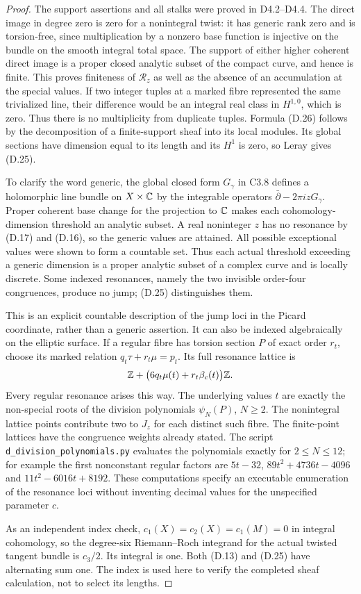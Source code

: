 \begin{proof}
The support assertions and all stalks were proved in D4.2--D4.4.
The direct image in degree zero is zero for a nonintegral twist:
it has generic rank zero and is torsion-free, since multiplication
by a nonzero base function is injective on the bundle on the smooth
integral total space. The support of either higher coherent direct
image is a proper closed analytic subset of the compact curve,
and hence is finite. This proves finiteness of $\mathcal R_z$ as
well as the absence of an accumulation at the special values.
If two integer tuples at a marked fibre represented the same
trivialized line, their difference would be an integral real class
in $H^{1,0}$, which is zero. Thus there is no multiplicity from
duplicate tuples. Formula (D.26) follows by the decomposition of a
finite-support sheaf into its local modules. Its global sections
have dimension equal to its length and its $H^1$ is zero, so Leray
gives (D.25).

To clarify the word generic, the global closed form $G_\gamma$ in
C3.8 defines a holomorphic line bundle on $X\times\mathbb C$ by the
integrable operators $\bar\partial-2\pi i zG_\gamma$. Proper
coherent base change for the projection to $\mathbb C$ makes each
cohomology-dimension threshold an analytic subset. A real noninteger
$z$ has no resonance by (D.17) and (D.16), so the generic values are
attained. All possible exceptional values were shown to form a
countable set. Thus each actual threshold exceeding a generic
dimension is a proper analytic subset of a complex curve and is
locally discrete. Some indexed resonances, namely the two invisible
order-four congruences, produce no jump; (D.25) distinguishes them.

This is an explicit countable description of the jump loci in the
Picard coordinate, rather than a generic assertion. It can also be
indexed algebraically on the elliptic surface. If a regular fibre
has torsion section $P$ of exact order $r_t$, choose its marked
relation $q_t\tau+r_t\mu=p_t$. Its full resonance lattice is
\[
 \mathbb Z+\bigl(6q_t\mu(t)+r_t\beta_c(t)\bigr)\mathbb Z.
\]
Every regular resonance arises this way. The underlying values
$t$ are exactly the non-special roots of the division polynomials
$\psi_N(P)$, $N\ge2$. The nonintegral lattice points contribute two
to $J_z$ for each distinct such fibre. The finite-point lattices
have the congruence weights already stated. The script
\texttt{d\_division\_polynomials.py} evaluates the polynomials
exactly for $2\le N\le12$; for example the first nonconstant
regular factors are $5t-32$, $89t^2+4736t-4096$ and
$11t^2-6016t+8192$. These computations specify an executable
enumeration of the resonance loci without inventing decimal values
for the unspecified parameter $c$.

As an independent index check, $c_1(X)=c_2(X)=c_1(M)=0$ in integral
cohomology, so the degree-six Riemann--Roch integrand for the actual
twisted tangent bundle is $c_3/2$. Its integral is one. Both (D.13)
and (D.25) have alternating sum one. The index is used here to
verify the completed sheaf calculation, not to select its lengths.
\end{proof}

